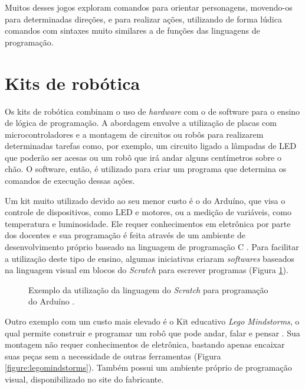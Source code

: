 Muitos desses jogos exploram comandos para orientar personagens, movendo-os para determinadas direções, e para realizar ações, utilizando de forma lúdica comandos com sintaxes muito similares a de funções das linguagens de programação.

\section{Kits de robótica}

Os kits de robótica combinam o uso de \textit{hardware} com o de software para o ensino de lógica de programação. A abordagem envolve a utilização de placas com microcontroladores e a montagem de circuitos ou robôs para realizarem determinadas tarefas como, por exemplo, um circuito ligado a lâmpadas de LED que poderão ser acesas ou um robô que irá andar alguns centímetros sobre o chão. O software, então, é utilizado para criar um programa que determina os comandos de execução dessas ações.

Um kit muito utilizado devido ao seu menor custo é o do Arduíno, que visa o controle de dispositivos, como LED e motores, ou a medição de variáveis, como temperatura e luminosidade. Ele requer conhecimentos em eletrônica por parte dos docentes e sua programação é feita através de um ambiente de desenvolvimento próprio baseado na linguagem de programação C \citep{klinczak2024estudo,demedeiros2019ensino}. Para facilitar a utilização deste tipo de ensino, algumas iniciativas criaram \textit{softwares} baseados na linguagem visual em blocos do \textit{Scratch} para escrever programas (Figura \ref{figure:arduino}).

\begin{figure}[h!]
    \centering
    \setlength{\fboxrule}{0.1pt} %
    \caption{Exemplo da utilização da linguagem do \textit{Scratch} para programação do Arduíno \citep{demedeiros2019ensino}.}
    \label{figure:arduino}
\end{figure}

Outro exemplo com um custo mais elevado é o Kit educativo \textit{Lego Mindstorms}, o qual permite construir e programar um robô que pode andar, falar e pensar \citep{legomindstorms2024}. Sua montagem não requer conhecimentos de eletrônica, bastando apenas encaixar suas peças sem a necessidade de outras ferramentas (Figura \ref{figure:legomindstorms}). Também possui um ambiente próprio de programação visual, disponibilizado no site do fabricante.

